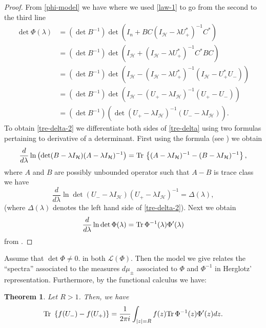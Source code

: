 \documentclass[12pt]{amsart}
\newtheorem{thm}{Theorem}[section]
\theoremstyle{definition}
\theoremstyle{remark}
\numberwithin{equation}{section}
\begin{document}
\begin{proof}

From \eqref{phi-model} we have where we used \eqref{law-1} to go from the second to the third line
  \[
    \begin{split}
\det\Phi({\lambda})&=(\det B^{-1})\det(I_n+BC(I_{\mathcal H}-{{\lambda}} U_+^*)^{-1}C^*)\\
&=(\det B^{-1})\det(I_{\mathcal H}+(I_{\mathcal H}-{{\lambda}} U_+^*)^{-1}C^*BC)\\
&=(\det B^{-1})\det(I_{\mathcal H}-(I_{\mathcal H}-{{\lambda}} U_+^*)^{-1}(I_{\mathcal H}-U_+^*U_-))\\
&=(\det B^{-1})\det(I_{\mathcal H}-(U_+-{{\lambda}} I_{\mathcal H})^{-1}(U_+-U_-))\\
&=(\det B^{-1})(\det(U_+-{{\lambda}} I_{\mathcal H})^{-1}(U_--{{\lambda}} I_{\mathcal H})).
\end{split}
\]
To obtain \eqref{tre-delta-2} we differentiate both sides of  \eqref{tre-delta} using  two formulas pertaining to derivative of a determinant.  First
using the formula (see \cite[Chapter 4, Section 2 p. 132]{MR86m:00014}) we obtain
        \begin{equation}
          \label{log-det}
          \frac{d}{d\lambda} \ln\left(    \det (B-{\lambda} I_{\mathcal H})(A-{\lambda} I_{\mathcal H})^{-1}\right)
          ={\rm Tr}\, \left\{(A-{\lambda}I_{\mathcal H})^{-1}-(B-{\lambda}I_{\mathcal H})^{-1}\right\},
          \end{equation}
          where $A$ and $B$ are possibly unbounded operator such that $A-B$ is trace class we have
          \begin{equation}
            \label{eqw1}
\frac{d}{d\lambda}\ln\det(U_--{\lambda}I_{\mathcal H})(U_+-{\lambda} I_{\mathcal H})^{-1}=\Delta({\lambda}),
\end{equation}
(where $\Delta({\lambda})$ denotes the left hand side of \eqref{tre-delta-2}). Next  we obtain
\[
\frac{d}{d{\lambda}}\ln\det\Phi({\lambda})={\rm Tr}\, \Phi^{-1}({\lambda})\Phi^\prime({\lambda})
  \]
from \cite[p. 129]{MR86m:00014}.
\end{proof}


   Assume that $\det\Phi\not=0$. in both $\mathcal L(\Phi)$.  Then the model we give relates the ``spectra'' associated to the measures
        $d\mu_\pm$ associated to $\Phi$ and $\Phi^{-1}$ in Herglotz' representation. Furthermore, by the functional calculus we have:


      \begin{thm}
Let $R>1$. Then, we have
        \begin{equation}
          {\rm Tr}\,\,\left\{ f(U_-)-f(U_+)\right\}=\frac{1}{2\pi i}\int_{|z|=R}f(z){\rm Tr}\, \Phi^{-1}(z)\Phi^\prime(z)dz .
        \end{equation}
      \end{thm}
\end{document}
